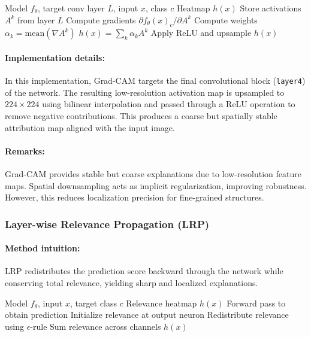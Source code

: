 \documentclass[11pt]{article}
\begin{document}
\begin{algorithm}[H]
\caption{Grad-CAM}
\label{alg:gradcam}
\begin{algorithmic}[1]
\REQUIRE Model $f_\theta$, target conv layer $L$, input $x$, class $c$
\ENSURE Heatmap $h(x)$
\STATE Store activations $A^k$ from layer $L$
\STATE Compute gradients $\partial f_\theta(x)_c / \partial A^k$
\STATE Compute weights $\alpha_k = \text{mean}(\nabla A^k)$
\STATE $h(x) = \sum_k \alpha_k A^k$
\STATE Apply ReLU and upsample
\RETURN $h(x)$
\end{algorithmic}
\end{algorithm}

\paragraph{Implementation details:}
In this implementation, Grad-CAM targets the final convolutional block (\texttt{layer4}) of the network. The resulting low-resolution activation map is upsampled to $224 \times 224$ using bilinear interpolation and passed through a ReLU operation to remove negative contributions. This produces a coarse but spatially stable attribution map aligned with the input image.

\paragraph{Remarks:}
Grad-CAM provides stable but coarse explanations due to low-resolution feature maps. Spatial downsampling acts as implicit regularization, improving robustness. However, this reduces localization precision for fine-grained structures.

\subsubsection{Layer-wise Relevance Propagation (LRP)}

\paragraph{Method intuition:}
LRP redistributes the prediction score backward through the network while conserving total relevance, yielding sharp and localized explanations.

\begin{algorithm}[H]
\caption{Layer-wise Relevance Propagation (LRP)}
\label{alg:lrp}
\begin{algorithmic}[1]
\REQUIRE Model $f_\theta$, input $x$, target class $c$
\ENSURE Relevance heatmap $h(x)$
\STATE Forward pass to obtain prediction
\STATE Initialize relevance at output neuron
    \STATE Redistribute relevance using $\epsilon$-rule
\ENDFOR
\STATE Sum relevance across channels
\RETURN $h(x)$
\end{algorithmic}
\end{algorithm}
\end{document}
